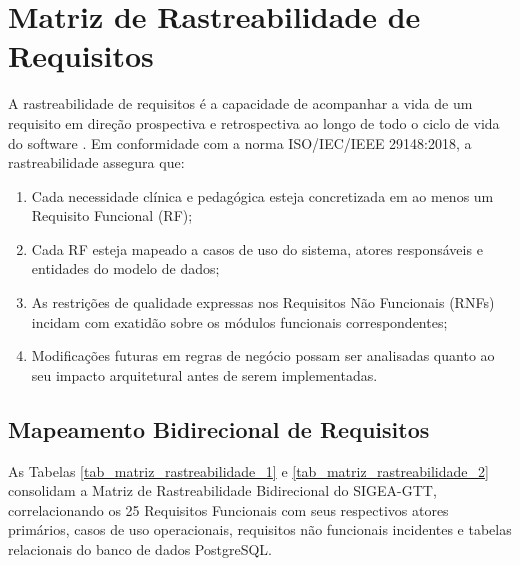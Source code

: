 \chapter{Matriz de Rastreabilidade de Requisitos}
\label{cap_matriz_rastreabilidade}

A rastreabilidade de requisitos é a capacidade de acompanhar a vida de um requisito em direção prospectiva e retrospectiva ao longo de todo o ciclo de vida do software \cite{sommerville2019,iso29148}. Em conformidade com a norma ISO/IEC/IEEE 29148:2018, a rastreabilidade assegura que:
\begin{enumerate}
    \item Cada necessidade clínica e pedagógica esteja concretizada em ao menos um Requisito Funcional (RF);
    \item Cada RF esteja mapeado a casos de uso do sistema, atores responsáveis e entidades do modelo de dados;
    \item As restrições de qualidade expressas nos Requisitos Não Funcionais (RNFs) incidam com exatidão sobre os módulos funcionais correspondentes;
    \item Modificações futuras em regras de negócio possam ser analisadas quanto ao seu impacto arquitetural antes de serem implementadas.
\end{enumerate}

\section{Mapeamento Bidirecional de Requisitos}
\label{sec_mapeamento_bidirecional}

As Tabelas \ref{tab_matriz_rastreabilidade_1} e \ref{tab_matriz_rastreabilidade_2} consolidam a Matriz de Rastreabilidade Bidirecional do SIGEA-GTT, correlacionando os 25 Requisitos Funcionais com seus respectivos atores primários, casos de uso operacionais, requisitos não funcionais incidentes e tabelas relacionais do banco de dados PostgreSQL.

